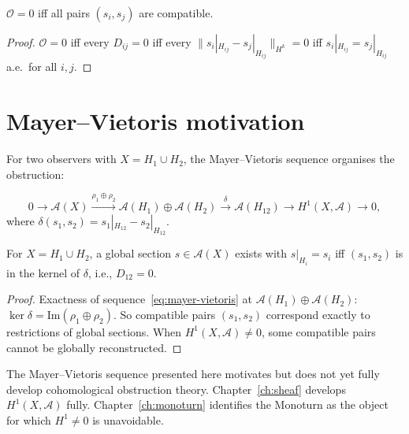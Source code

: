 \begin{proposition}
  \label{prop:zero-obstruction}
  \statusproven{}
  $\mathcal{O} = 0$ iff all pairs $(s_i, s_j)$ are compatible.
\end{proposition}

\begin{proof}
  $\mathcal{O} = 0$ iff every $D_{ij} = 0$ iff every
  $\|s_i|_{H_{ij}} - s_j|_{H_{ij}}\|_{H^k} = 0$ iff
  $s_i|_{H_{ij}} = s_j|_{H_{ij}}$ a.e.\ for all $i,j$.
\end{proof}

\section{Mayer--Vietoris motivation}

For two observers with $X = H_1 \cup H_2$, the Mayer--Vietoris
sequence organises the obstruction:

\begin{equation}
  0
  \to \mathcal{A}(X)
  \xrightarrow{\rho_1 \oplus \rho_2}
  \mathcal{A}(H_1) \oplus \mathcal{A}(H_2)
  \xrightarrow{\delta}
  \mathcal{A}(H_{12})
  \to H^1(X, \mathcal{A})
  \to 0,
  \label{eq:mayer-vietoris}
\end{equation}
where $\delta(s_1, s_2) = s_1|_{H_{12}} - s_2|_{H_{12}}$.

\begin{theorem}
  \label{thm:two-observer}
  \statusproven{}
  For $X = H_1 \cup H_2$, a global section $s \in \mathcal{A}(X)$
  exists with $s|_{H_i} = s_i$ iff $(s_1, s_2)$ is in the
  kernel of $\delta$, i.e., $D_{12} = 0$.
\end{theorem}

\begin{proof}
  Exactness of sequence~\eqref{eq:mayer-vietoris} at
  $\mathcal{A}(H_1) \oplus \mathcal{A}(H_2)$:
  $\ker\delta = \mathrm{Im}(\rho_1 \oplus \rho_2)$.
  So compatible pairs $(s_1, s_2)$ correspond exactly to
  restrictions of global sections.
  When $H^1(X,\mathcal{A}) \neq 0$, some compatible pairs
  cannot be globally reconstructed.
\end{proof}

\begin{ForwardRef}
  The Mayer--Vietoris sequence presented here motivates but
  does not yet fully develop cohomological obstruction theory.
  Chapter~\ref{ch:sheaf} develops $H^1(X,\mathcal{A})$ fully.
  Chapter~\ref{ch:monoturn} identifies the Monoturn as the
  object for which $H^1 \neq 0$ is unavoidable.
\end{ForwardRef}

